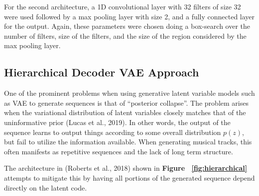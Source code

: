 \documentclass[10pt,twocolumn]{article}
\begin{document}
For the second architecture, a 1D convolutional layer with 32 filters of size 32 were used followed by a max pooling layer with size 2, and a fully connected layer for the output. Again, these parameters were chosen doing a box-search over the number of filters, size of the filters, and the size of the region considered by the max pooling layer.

\subsection{Hierarchical Decoder VAE Approach}

One of the prominent problems when using generative latent variable models such as VAE to generate sequences is that of ``posterior collapse''. The problem arises when the variational distribution of latent variables closely matches that of the uninformative prior (Lucas et al., 2019)\cite{lucas2019understanding}. In other words, the output of the sequence learns to output things according to some overall distribution $p(z)$, but fail to utilize the information available. When generating musical tracks, this often manifests as repetitive sequences and the lack of long term structure.

The architecture in (Roberts et al., 2018) shown in \textbf{Figure ~\ref{fig:hierarchical}} attempts to mitigate this by having all portions of the generated sequence depend directly on the latent code.

\begin{figure}[H]
\end{figure}
\end{document}
